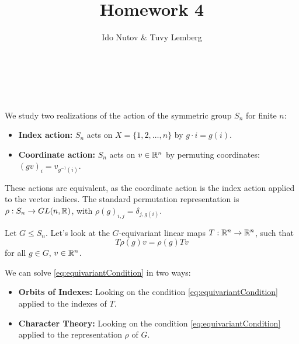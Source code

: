 \documentclass[english]{article}
\begin{document}

\title{Homework 4}
\author{Ido Nutov \& Tuvy Lemberg}
\maketitle

\section{~}


We study two realizations of the action of the symmetric group $S_n$ for finite $n$:
\begin{itemize}
    \item \textbf{Index action:} $S_n$ acts on $X = \{1,2,\ldots,n\}$ by $g \cdot i = g(i)$.
    \item \textbf{Coordinate action:} $S_n$ acts on $v \in \mathbb{R}^n$ by permuting coordinates: $(gv)_i = v_{g^{-1}(i)}$.
\end{itemize}
These actions are equivalent, as the coordinate action is the index action applied to the vector indices. The standard permutation representation is $\rho: S_n \to GL(n, \mathbb{R})$, with $\rho(g)_{i,j} = \delta_{j,g(i)}$.

Let $G \leq S_n$. Let's look at the $G$-equivariant linear maps $T: \mathbb{R}^n \to \mathbb{R}^n$, such that
\begin{equation}
T\rho(g)v = \rho(g)Tv
\label{eq:equivariantCondition}
\end{equation}
for all $g \in G$, $v \in \mathbb{R}^n$.

We can solve \eqref{eq:equivariantCondition} in two ways:
\begin{itemize}
    \item \textbf{Orbits of Indexes:} Looking on the condition \eqref{eq:equivariantCondition} applied to the indexes of $T$.
    \item \textbf{Character Theory:} Looking on the condition \eqref{eq:equivariantCondition} applied to the representation $\rho$ of $G$.
\end{itemize}
\end{document}
